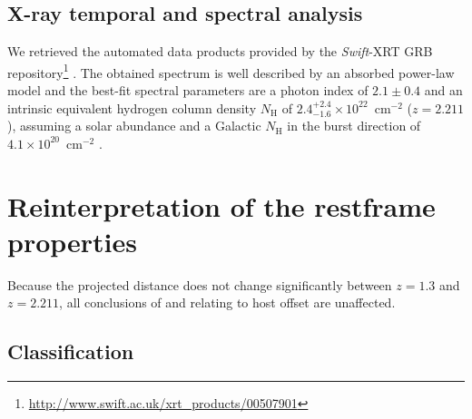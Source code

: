 \documentclass{aa}    %
\begin{document}
\subsection{X-ray temporal and spectral analysis}

We retrieved the automated data products provided by the \textit{Swift}-XRT GRB
repository\footnote{\url{http://www.swift.ac.uk/xrt\_products/00507901}}
\citep{Evans2009}. 
The obtained spectrum is well described by an absorbed power-law
model and the best-fit spectral parameters are a photon index of $2.1 \pm 0.4$ and
an intrinsic equivalent hydrogen column density $N_{\mathrm{H}}$ of $2.4_{-1.6}^{+2.4}
\times 10^{22}$~cm$^{-2}$ ($z=2.211$), assuming a solar abundance and a Galactic $N_{\mathrm{H}}$ in
the burst direction of $4.1 \times 10^{20}$~cm$^{-2}$ \citep{Willingale2013}.

\section{Reinterpretation of the restframe properties}

Because the projected distance does not change significantly between $z = 1.3$ and $z =
2.211$, all conclusions of \citet{Margutti2012} and \citet{Sakamoto2013}
relating to host offset are unaffected.

\subsection{Classification}
\end{document}
